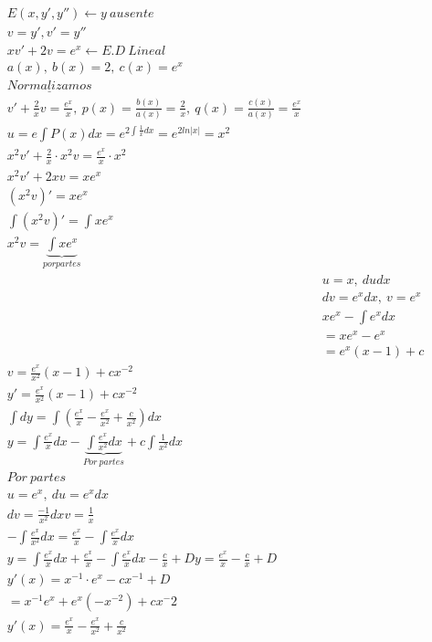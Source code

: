 \documentclass{article}
\begin{document}
\begin{eqnarray}
\nonumber  E \left( x,y',y'' \right) \leftarrow y \ ausente  \\
\nonumber  v = y' ,  v'= y''  \\
\nonumber xv' + 2v = e^x  \leftarrow E.D \ Lineal \\
\nonumber  a(x), \ b(x) = 2, \ c(x) = e^x \\
\nonumber \underline{Normalizamos} \\
\nonumber v' +  \frac{2}{x} v = \frac{e^x}{x}  , \ p(x)  = \frac{b(x)}{a(x)} = \frac{2}{x} , \ q(x) = \frac{c(x)}{a(x)} = \frac{e^x}{x} \\
\nonumber u = e{\int P(x) dx} =  e^{2 \int \frac{1}{x} dx} = e^{2 ln |x|} = x^2 \\
\nonumber x^2 v' +  \frac{2}{x} \cdot x^2v = \frac{e^x}{x} \cdot x^2 \\
\nonumber x^2 v' + 2xv = xe^x \\
\nonumber  \left( x^2 v \right)' = xe^x \\
\nonumber \int \left( x^2 v \right)' = \int xe^x \\
\nonumber x^2 v = \underbrace{\int xe^x}_{por partes} \\
\nonumber & & u = x ,  \ du   dx \\
\nonumber & & dv = e^x dx, \ v = e^x \\
\nonumber & & xe^x - \int e^x dx \\
\nonumber & & = xe^x - e^x \\
\nonumber & & = e^x \left( x-1 \right) + c \\
\nonumber v = \frac{e^x}{x^2} \left( x-1 \right) + cx^{-2} \\
\nonumber y'= \frac{e^x}{x^2} \left( x-1 \right) + cx^{-2}\\
\nonumber \int dy = \int \left( \frac{e^x}{x} -\frac{e^x}{x^2} + \frac{c}{x^2} \right) dx \\ 
\nonumber y = \int  \frac{e^x}{x} dx - \underbrace{\int \frac{e^x}{x^2} dx}_{Por \ partes} + c \int \frac{1}{x^2} dx \\
\nonumber Por \ partes \\
\nonumber u= e^x , \ du = e^xdx \\
\nonumber dv = \frac{-1}{x^2} dx v = \frac{1}{x} \\
\nonumber - \int \frac{e^x}{x^2} dx = \frac{e^x}{x} - \int \frac{e^x}{x}dx \\
\nonumber y = \int \frac{e^x}{x}dx +\frac{e^x}{x} - \int \frac{e^x}{x} dx - \frac{c}{x} + D
\nonumber y = \frac{e^x}{x} - \frac{c}{x} +D\\
\nonumber y'(x) = x^{-1} \cdot e^x - cx^{-1} + D \\
\nonumber = x^{-1} e^x + e^x \left( -x^{-2} \right) + cx^-2\\
\nonumber y'(x) = \frac{e^x}{x} -\frac{e^x}{x^2} + \frac{c}{x^2}  \\ 
\end{eqnarray}
\end{document}

